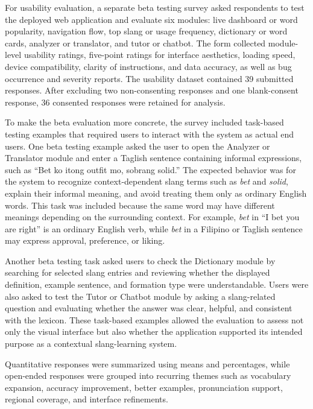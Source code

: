 For usability evaluation, a separate beta testing survey asked respondents to test the deployed web application and evaluate six modules: live dashboard or word popularity, navigation flow, top slang or usage frequency, dictionary or word cards, analyzer or translator, and tutor or chatbot. The form collected module-level usability ratings, five-point ratings for interface aesthetics, loading speed, device compatibility, clarity of instructions, and data accuracy, as well as bug occurrence and severity reports. The usability dataset contained 39 submitted responses. After excluding two non-consenting responses and one blank-consent response, 36 consented responses were retained for analysis.

To make the beta evaluation more concrete, the survey included task-based testing examples that required users to interact with the system as actual end users. One beta testing example asked the user to open the Analyzer or Translator module and enter a Taglish sentence containing informal expressions, such as ``Bet ko itong outfit mo, sobrang solid.'' The expected behavior was for the system to recognize context-dependent slang terms such as \textit{bet} and \textit{solid}, explain their informal meaning, and avoid treating them only as ordinary English words. This task was included because the same word may have different meanings depending on the surrounding context. For example, \textit{bet} in ``I bet you are right'' is an ordinary English verb, while \textit{bet} in a Filipino or Taglish sentence may express approval, preference, or liking.

Another beta testing task asked users to check the Dictionary module by searching for selected slang entries and reviewing whether the displayed definition, example sentence, and formation type were understandable. Users were also asked to test the Tutor or Chatbot module by asking a slang-related question and evaluating whether the answer was clear, helpful, and consistent with the lexicon. These task-based examples allowed the evaluation to assess not only the visual interface but also whether the application supported its intended purpose as a contextual slang-learning system.

Quantitative responses were summarized using means and percentages, while open-ended responses were grouped into recurring themes such as vocabulary expansion, accuracy improvement, better examples, pronunciation support, regional coverage, and interface refinements.